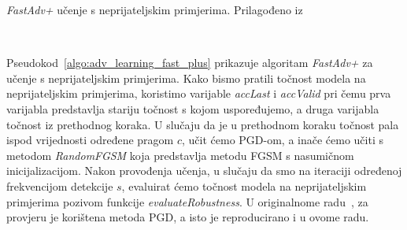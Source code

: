 \documentclass[times, utf8, zavrsni, numeric]{fer}
\newcommand{\pluseq}{\mathrel{+}=}
\begin{document}
\pagebreak

\begin{algorithm}[t]
    \caption{\textit{FastAdv+} učenje s neprijateljskim primjerima. Prilagođeno iz~\cite{li2020towards}}
    \label{algo:adv_learning_fast_plus}
    \begin{algorithmic}
        \\\hrulefill
                \ELSE 
                \ENDIF
                \STATE{$grad \pluseq \nabla_{\theta}L(x_{adv},y_{i};\theta)$}
                \ENDIF 
            \ENDFOR
        \ENDFOR
    \end{algorithmic}
\end{algorithm}

Pseudokod~\ref{algo:adv_learning_fast_plus} prikazuje algoritam \textit{FastAdv+} za učenje s neprijateljskim primjerima.
Kako bismo pratili točnost modela na neprijateljskim primjerima, koristimo varijable \textit{accLast} i \textit{accValid} 
pri čemu prva varijabla predstavlja stariju točnost s kojom uspoređujemo, a druga varijabla točnost iz prethodnog koraka.
U slučaju da je u prethodnom koraku točnost pala ispod vrijednosti određene pragom $c$, učit ćemo PGD-om, a inače ćemo učiti s metodom \textit{RandomFGSM} koja predstavlja metodu FGSM s nasumičnom inicijalizacijom.
Nakon provođenja učenja, u slučaju da smo na iteraciji određenoj frekvencijom detekcije $s$, evaluirat ćemo točnost modela na neprijateljskim primjerima pozivom funkcije \textit{evaluateRobustness}.
U originalnome radu~\cite{li2020towards}, za provjeru je korištena metoda PGD, a isto je reproducirano i u ovome radu. 
\end{document}
